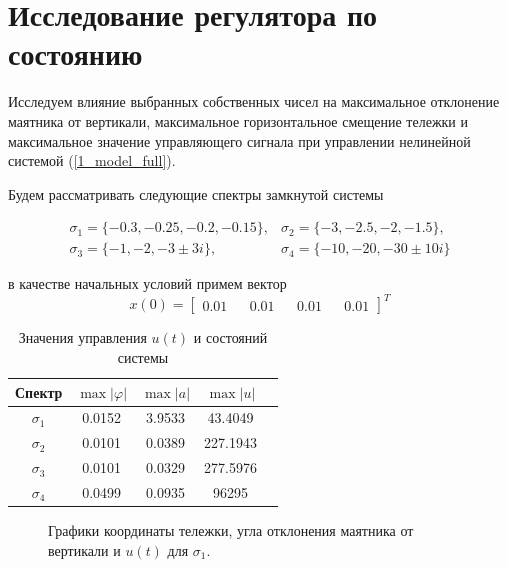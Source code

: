 \section{Исследование регулятора по состоянию}

Исследуем влияние выбранных собственных чисел на максимальное отклонение маятника от вертикали, максимальное горизонтальное смещение тележки и максимальное значение управляющего сигнала при управлении нелинейной системой (\ref{1_model_full}).

Будем рассматривать следующие спектры замкнутой системы

\begin{equation*}
  \begin{matrix}
      \sigma_1 = \{ -0.3, -0.25, -0.2, -0.15 \}, & \sigma_2 = \{ -3, -2.5, -2, -1.5 \},\\
      \sigma_3 = \{ -1, -2, -3 \pm 3i \}, & \sigma_4 = \{ -10, -20, -30 \pm 10i \}
 \end{matrix}
\end{equation*}

в качестве начальных условий примем вектор $$x(0) = \begin{bmatrix}
    0.01&&
    0.01&&
    0.01&&
    0.01
\end{bmatrix}^T$$

\begin{table}[h]
\centering
\caption{Значения управления \( u(t) \) и состояний системы}
\label{tab:results}
\begin{tabular}{ccccc}
\toprule
Спектр & $\max |\varphi|$ & $\max |a|$ & $\max |u|$ \\
\midrule
$\sigma_1$  &  0.0152  &  3.9533  &  43.4049  \\
$\sigma_2$  &  0.0101  &  0.0389  &  227.1943  \\
$\sigma_3$  &  0.0101  &  0.0329  &  277.5976  \\
$\sigma_4$  &  0.0499  &  0.0935  &  96295  \\
\bottomrule
\end{tabular}
\end{table}

\begin{figure}[!h]
\caption{Графики координаты тележки, угла отклонения маятника от вертикали и $u(t)$ для $\sigma_1$.}
\label{3_x_nlin_s1}
\end{figure}

